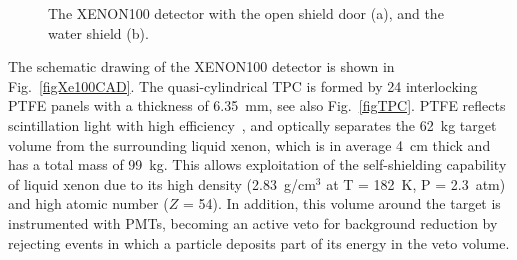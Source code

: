 \begin{figure}[!h]
\centering
{}
\caption[The XENON100 detector with the open shield door, and the water shield]{The XENON100 detector with the open shield door (a), and the water shield (b).}
\label{figXe100shield}
\end{figure}

The schematic drawing of the XENON100 detector is shown in Fig.~\ref{figXe100CAD}.
The quasi-cylindrical TPC is formed by 24 interlocking PTFE panels with a thickness of 6.35~mm, see also Fig.~\ref{figTPC}. PTFE reflects scintillation light with high efficiency~\cite{yamashita}, and optically separates the 62~kg target volume from the surrounding liquid xenon, which is in average 4~cm thick and has a total mass of 99~kg. This allows exploitation of the self-shielding capability of liquid xenon due to its high density (2.83~g/cm$^{3}$ at T = 182~K, P = 2.3~atm) and high atomic number ($Z$ = 54). In addition, this volume around the target is instrumented with PMTs, becoming an active veto for background reduction by rejecting events in which a particle deposits part of its energy in the veto volume. 

